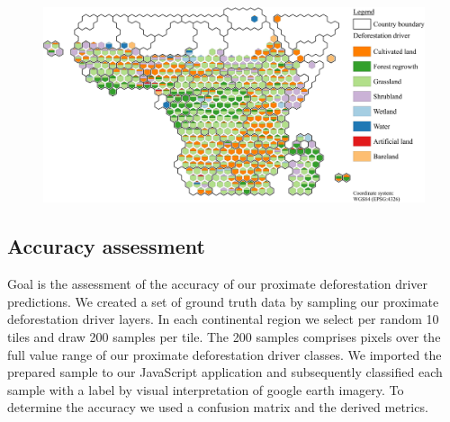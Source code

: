 			\begin{figure}[ht]
				\centering
				\includegraphics[scale=1]{img/africa_driver_frameless}
				\caption[Map of proximate deforestion driver in Africa]{}
				\label{fig:africa_driver}
			\end{figure}

		\subsection{Accuracy assessment}
		\label{subsec:results_accuracy_assessment}
			 Goal is the assessment of the accuracy of our proximate deforestation driver predictions. We created a set of ground truth data by sampling our proximate deforestation driver layers. In each continental region we select per random 10 tiles and draw 200 samples per tile. The 200 samples comprises pixels over the full value range of our proximate deforestation driver classes. We imported the prepared sample to our JavaScript application and subsequently classified each sample with a label by visual interpretation of google earth imagery. To determine the accuracy we used a confusion matrix and the derived metrics.

